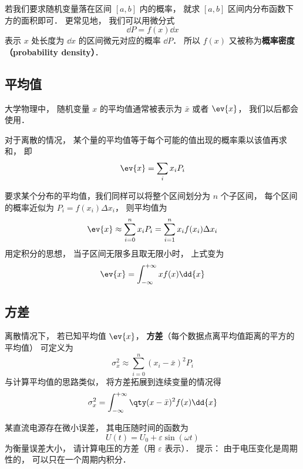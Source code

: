 若我们要求随机变量落在区间 $[a,b]$ 内的概率， 就求 $[a,b]$ 区间内分布函数下方的面积即可． 更常见地， 我们可以用微分式
\begin{equation}
\dd{P} = f(x) \dd{x}
\end{equation}
表示 $x$ 处长度为 $\dd{x}$ 的区间微元对应的概率 $\dd{P}$． 所以 $f(x)$ 又被称为\textbf{概率密度（probability density）}．

\subsection{平均值}
大学物理中， 随机变量 $x$ 的平均值通常被表示为 $\bar x$ 或者 $\ev{x}$， 我们以后都会使用．

对于离散的情况， 某个量的平均值等于每个可能的值出现的概率乘以该值再求和， 即
\begin{equation}
\ev{x} = \sum_i x_i P_i
\end{equation}

要求某个分布的平均值，我们同样可以将整个区间划分为 $n$ 个子区间， 每个区间的概率近似为 $P_i = f(x_i) \Delta x_i$， 则平均值为
\begin{equation}
\ev{x} \approx \sum_{i=0}^n x_i P_i = \sum_{i=1}^n x_i f(x_i) \Delta x_i
\end{equation}
用定积分的思想， 当子区间无限多且取无限小时， 上式变为
\begin{equation}\label{RandF_eq7}
\ev{x} = \int_{-\infty}^{+\infty} x f(x) \dd{x}
\end{equation}

\subsection{方差}
离散情况下， 若已知平均值 $\ev{x}$， \textbf{方差}（每个数据点离平均值距离的平方的平均值） 可定义为
\begin{equation}
\sigma_x^2 \approx \sum_{i=0}^n (x_i - \bar x)^2 P_i
\end{equation}
与计算平均值的思路类似， 将方差拓展到连续变量的情况得
\begin{equation}\label{RandF_eq6}
\sigma_x^2 = \int_{-\infty}^{+\infty} \qty(x-\bar x)^2 f(x) \dd{x}
\end{equation}

\begin{exercise}{}
某直流电源存在微小误差， 其电压随时间的函数为
\begin{equation}
U(t) = U_0 + \varepsilon \sin(\omega t)
\end{equation}
为衡量误差大小， 请计算电压的方差（用 $\varepsilon$ 表示）． 提示： 由于电压变化是周期性的， 可以只在一个周期内积分．
\end{exercise}

